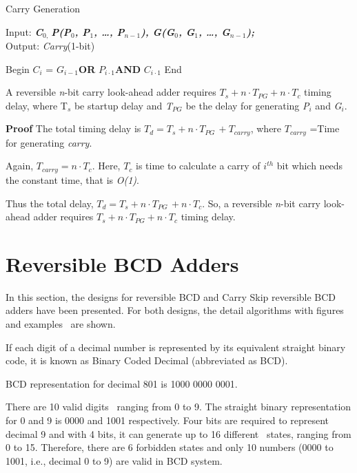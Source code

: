 \begin{algorithm}[!tbh]
\caption{Carry Generation}
\label{alg:part1_c2_alg5}
Input: {\bf {\it C${}_{0,\ }$P(P${}_{0}$, P${}_{1}$, {\dots}, P${}_{n-1}$), G(G${}_{0}$, G${}_{1}$, {\dots}, G${}_{n-1}$);}}\\
Output: {{ \textit{Carry}(1-bit)}}
\begin{algorithmic}[1]
\STATE Begin
\STATE $C{}_{i}$ = $G{}_{i-1}${\bf OR} $P{}_{i\cdot 1}${\bf AND} $C{}_{i\cdot 1}$
\ENDFOR
{}
\STATE End
\end{algorithmic}
\end{algorithm}
\begin{property}\textnormal{
A reversible {\it n}-bit carry look-ahead adder requires {$T{}_{s} + n \cdot T{}_{PG}+ n \cdot T{}_{c}$} timing delay, where T${}_{s}$ be startup delay and {\it T${}_{PG}$} be the delay for generating {\it P${}_{i}$} and {\it G${}_{i}$}.}
\end{property}

\noindent\textbf{Proof}{
The total timing delay is
{$T{}_{d} = T{}_{s}+n\cdot T{}_{PG\ }+T{}_{carry}$}, where {$T{}_{carry}$} =Time for generating {\it carry}.}

\textnormal{
Again, {$T{}_{carry} = n \cdot T{}_{c}$}. Here, {$T{}_{c}$} is time to calculate a carry of {$i{}^{th}$} bit which needs the constant time, that is {\it O(1)}.}

\textnormal{
Thus the total delay, {$T{}_{d} = T{}_{s} + n \cdot T{}_{PG\ }+ n \cdot T{}_{c}$}. So, a reversible {\it n}-bit carry look-ahead adder requires {$T{}_{s} + n \cdot T{}_{PG} + n \cdot T{}_{c}$} timing delay.}


\section{Reversible BCD Adders}
In this section, the designs for reversible BCD and Carry Skip reversible BCD adders have been presented. For both designs, the detail algorithms with figures and examples~ are shown.
\begin{property}\textnormal{
If each digit of a decimal number is represented by its equivalent straight binary code, it is known as Binary Coded Decimal (abbreviated as BCD).}
\end{property}
\begin{example}\textnormal{
BCD representation for decimal 801 is 1000 0000 0001.}

\textnormal{There are 10 valid digits~ ranging from 0 to 9. The straight binary representation for 0 and 9 is 0000 and 1001 respectively. Four bits are required to represent decimal 9 and with 4 bits, it can generate up to 16 different~ states, ranging from 0 to 15. Therefore, there are 6 forbidden states and only 10 numbers (0000 to 1001, i.e., decimal 0 to 9) are valid in BCD system.}
\end{example}

